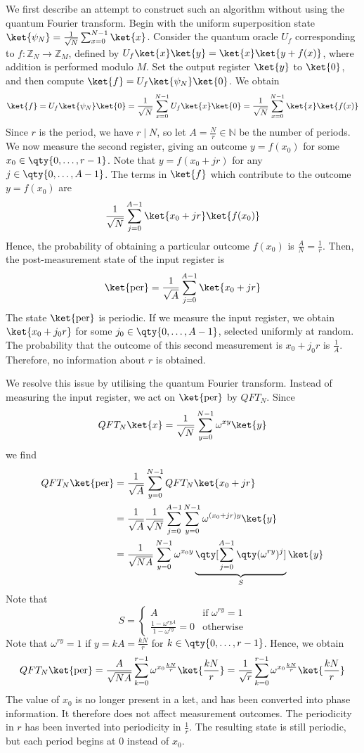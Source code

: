 We first describe an attempt to construct such an algorithm without using the quantum Fourier transform.
Begin with the uniform superposition state $\ket{\psi_N} = \frac{1}{\sqrt{N}} \sum_{x=0}^{N-1} \ket{x}$.
Consider the quantum oracle $U_f$ corresponding to $f \colon \mathbb Z_N \to \mathbb Z_M$, defined by $U_f \ket{x} \ket{y} = \ket{x} \ket{y + f(x)}$, where addition is performed modulo $M$.
Set the output register $\ket{y}$ to $\ket{0}$, and then compute $\ket{f} = U_f \ket{\psi_N} \ket{0}$.
We obtain
\[ \ket{f} = U_f \ket{\psi_N} \ket{0} = \frac{1}{\sqrt{N}} \sum_{x=0}^{N-1} U_f \ket{x} \ket{0} = \frac{1}{\sqrt{N}} \sum_{x=0}^{N-1} \ket{x} \ket{f(x)} \]
Since $r$ is the period, we have $r \mid N$, so let $A = \frac{N}{r} \in \mathbb N$ be the number of periods.
We now measure the second register, giving an outcome $y = f(x_0)$ for some $x_0 \in \qty{0, \dots, r-1}$.
Note that $y = f(x_0 + jr)$ for any $j \in \qty{0, \dots, A-1}$.
The terms in $\ket{f}$ which contribute to the outcome $y = f(x_0)$ are
\[ \frac{1}{\sqrt{N}} \sum_{j=0}^{A-1} \ket{x_0 + jr} \ket{f(x_0)} \]
Hence, the probability of obtaining a particular outcome $f(x_0)$ is $\frac{A}{N} = \frac{1}{r}$.
Then, the post-measurement state of the input register is
\[ \ket{\text{per}} = \frac{1}{\sqrt{A}} \sum_{j=0}^{A-1} \ket{x_0 + jr} \]
The state $\ket{\text{per}}$ is periodic.
If we measure the input register, we obtain $\ket{x_0 + j_0 r}$ for some $j_0 \in \qty{0, \dots, A-1}$, selected uniformly at random.
The probability that the outcome of this second measurement is $x_0 + j_0 r$ is $\frac{1}{A}$.
Therefore, no information about $r$ is obtained.

We resolve this issue by utilising the quantum Fourier transform.
Instead of measuring the input register, we act on $\ket{\text{per}}$ by $QFT_N$.
Since
\[ QFT_N\ket{x} = \frac{1}{\sqrt{N}}\sum_{y=0}^{N-1}\omega^{xy} \ket{y} \]
we find
\begin{align*}
    QFT_N \ket{\text{per}} &= \frac{1}{\sqrt{A}}\sum_{y=0}^{N-1} QFT_N \ket{x_0 + jr} \\
    &= \frac{1}{\sqrt{A}} \frac{1}{\sqrt{N}} \sum_{j=0}^{A-1} \sum_{y=0}^{N-1} \omega^{(x_0 + jr)y} \ket{y} \\
    &= \frac{1}{\sqrt{NA}} \sum_{y=0}^{N-1} \omega^{x_0 y} \underbrace{\qty[\sum_{j=0}^{A-1} \qty(\omega^{ry})^j]}_S \ket{y}
\end{align*}
Note that
\[ S = \begin{cases}
    A & \text{if } \omega^{ry} = 1 \\
    \frac{1 - \omega^{ryA}}{1 - \omega^{ry}} = 0 & \text{otherwise}
\end{cases} \]
Note that $\omega^{ry} = 1$ if $y = kA = \frac{kN}{r}$ for $k \in \qty{0, \dots, r - 1}$.
Hence, we obtain
\[ QFT_N \ket{\text{per}} = \frac{A}{\sqrt{NA}} \sum_{k=0}^{r-1} \omega^{x_0 \frac{kN}{r}} \ket{\frac{kN}{r}} = \frac{1}{\sqrt{r}} \sum_{k=0}^{r-1} \omega^{x_0 \frac{kN}{r}} \ket{\frac{kN}{r}} \]
The value of $x_0$ is no longer present in a ket, and has been converted into phase information.
It therefore does not affect measurement outcomes.
The periodicity in $r$ has been inverted into periodicity in $\frac{1}{r}$.
The resulting state is still periodic, but each period begins at 0 instead of $x_0$.

